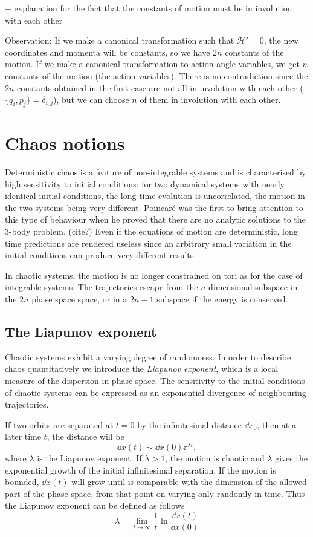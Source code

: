 \documentclass[../thesis.tex]{subfiles}
\theoremstyle{plain}
\begin{document}
{\color{red}+ explanation for the fact that the constants of motion must be
in involution with each other

Observation:
If we make a canonical transformation such that \(\mathcal{H'} = 0\), the new
coordinates and momenta will be constants, so we have \(2n\) constants of the motion.
If we make a canonical transformation to action-angle variables, we get
\(n\) constants of the motion (the action variables).
There is no contradiction since the \(2n\) constants obtained in the first case
are not all in involution with each other (\( \{q_i,p_j\}=\delta_{i,j} \)), but
we can choose \(n\) of them in involution with each other.
}


\section{Chaos notions}

Deterministic chaos is a feature of non-integrable systems and is characterised
by high sensitivity to initial conditions: for two dynamical systems with
nearly identical initial conditions, the long time evolution is uncorrelated,
the motion in the two systems being very different.
Poincaré was the first to bring attention to this type of behaviour when he
proved that there are no analytic solutions to the 3-body problem. ({\color{red}cite?})
Even if the equations of motion are deterministic, long time predictions are
rendered useless since an arbitrary small variation in the initial conditions
can produce very different results.

In chaotic systems, the motion is no longer constrained on tori as for the case
of integrable systems. The trajectories escape from the \(n\) dimensional subspace
in the \(2n\) phase space space, or in a \(2n-1\) subspace if the energy is
conserved.


\subsection{The Liapunov exponent}

Chaotic systems exhibit a varying degree of randomness. In order to describe
chaos quantitatively we introduce the \emph{Liapunov exponent}, which is a local measure
of the dispersion in phase space.
The sensitivity to the initial conditions of chaotic systems can be expressed
as an exponential divergence of neighbouring trajectories.

If two orbits are separated at \(t=0\) by the infinitesimal distance \(\dd{x_0}\),
then at a later time \(t\), the distance will be
\[
  \dd{x}(t) \sim \dd{x}(0) \ee^{\lambda t},
\]
where \(\lambda \) is the Liapunov exponent.
If \(\lambda > 1\), the motion is chaotic and \(\lambda \) gives the exponential
growth of the initial infinitesimal separation. If the motion is bounded,
\(\dd{x}(t)\) will grow until is comparable with the dimension of the
allowed part of the phase space, from that point on varying only randomly in time.
Thus the Liapunov exponent can be defined as follows
\begin{equation}
  \label{eq:liapunov}
  \lambda = \lim_{t \to \infty} \frac{1}{t} \ln{\frac{\dd{x}(t)}{\dd{x}(0)}}
\end{equation}
\end{document}
